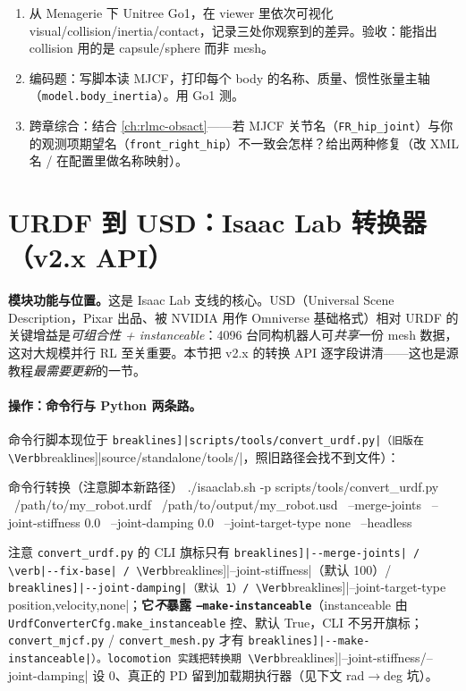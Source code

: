 \begin{practice}[动手：转换并体检一台四足]
\begin{enumerate}
  \item 从 Menagerie 下 Unitree Go1，在 viewer 里依次可视化 visual/collision/inertia/contact，记录三处你观察到的差异。验收：能指出 collision 用的是 capsule/sphere 而非 mesh。
  \item 编码题：写脚本读 MJCF，打印每个 body 的名称、质量、惯性张量主轴（\texttt{model.\allowbreak body\_inertia}）。用 Go1 测。
  \item 跨章综合：结合 \cref{ch:rlmc-obsact}——若 MJCF 关节名（\texttt{FR\_hip\_joint}）与你的观测项期望名（\texttt{front\_right\_hip}）不一致会怎样？给出两种修复（改 XML 名 / 在配置里做名称映射）。
\end{enumerate}
\end{practice}

\section{URDF 到 USD：Isaac Lab 转换器（v2.x API）}
\label{sec:rlmc-assets-usd}

\textbf{模块功能与位置。}这是 Isaac Lab 支线的核心。USD（Universal Scene Description，Pixar 出品、被 NVIDIA 用作 Omniverse 基础格式）相对 URDF 的关键增益是\emph{可组合性 + instanceable}：4096 台同构机器人可\emph{共享}一份 mesh 数据，这对大规模并行 RL 至关重要。本节把 v2.x 的转换 API 逐字段讲清——这也是源教程\emph{最需要更新}的一节。

\paragraph{操作：命令行与 Python 两条路。}命令行脚本现位于 \Verb[breaklines]|scripts/tools/convert_urdf.py|（旧版在 \Verb[breaklines]|source/standalone/tools/|，照旧路径会找不到文件）：

\begin{codebox}[bash]{命令行转换（注意脚本新路径）}
./isaaclab.sh -p scripts/tools/convert_urdf.py \
    /path/to/my_robot.urdf \
    /path/to/output/my_robot.usd \
    --merge-joints \
    --joint-stiffness 0.0 \
    --joint-damping 0.0 \
    --joint-target-type none \
    --headless
\end{codebox}

\noindent{}注意 \texttt{convert\_urdf.\allowbreak py} 的 CLI 旗标只有 \Verb[breaklines]|--merge-joints| / \verb|--fix-base| / \Verb[breaklines]|--joint-stiffness|（默认 100）/ \Verb[breaklines]|--joint-damping|（默认 1）/ \Verb[breaklines]|--joint-target-type {position,velocity,none}|；\textbf{它\emph{不}暴露 \texttt{--make-instanceable}}（instanceable 由 \texttt{UrdfConverterCfg.\allowbreak make\_instanceable} 控、默认 True，CLI 不另开旗标；\texttt{convert\_mjcf.\allowbreak py} / \texttt{convert\_mesh.\allowbreak py} 才有 \Verb[breaklines]|--make-instanceable|）。locomotion 实践把转换期 \Verb[breaklines]|--joint-stiffness/--joint-damping| 设 0、真正的 PD 留到加载期执行器（见下文 rad$\to$deg 坑）。


